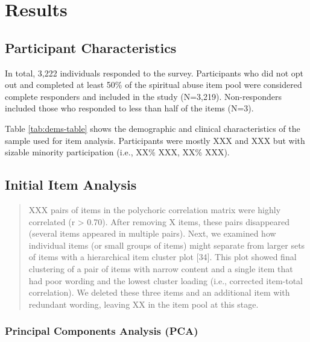 \documentclass[
]{article}
\begin{document}
\hypertarget{results}{%
\section{Results}\label{results}}

\hypertarget{participant-characteristics}{%
\subsection{Participant Characteristics}\label{participant-characteristics}}

In total, 3,222 individuals responded to the survey. Participants who did not opt out and completed at least 50\% of the spiritual abuse item pool were considered complete responders and included in the study (N=3,219). Non-responders included those who responded to less than half of the items (N=3).

Table \ref{tab:dems-table} shows the demographic and clinical characteristics of the sample used for item analysis. Participants were mostly XXX and XXX but with sizable minority participation (i.e., XX\% XXX, XX\% XXX).

\hypertarget{initial-item-analysis}{%
\subsection{Initial Item Analysis}\label{initial-item-analysis}}

\begin{quote}
XXX pairs of items in the polychoric correlation matrix were highly correlated (r \textgreater{} 0.70). After removing X items, these pairs disappeared (several items appeared in multiple pairs). Next, we examined how individual items (or small groups of items) might separate from larger sets of items with a hierarchical item cluster plot {[}34{]}. This plot showed final clustering of a pair of items with narrow content and a single item that had poor wording and the lowest cluster loading (i.e., corrected item-total correlation). We deleted these three items and an additional item with redundant wording, leaving XX in the item pool at this stage.
\end{quote}

\hypertarget{principal-components-analysis-pca}{%
\subsubsection{Principal Components Analysis (PCA)}\label{principal-components-analysis-pca}}
\end{document}
